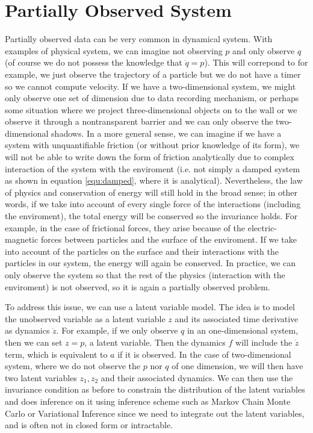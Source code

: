 \documentclass{statsmsc}
\begin{document}
\section{Partially Observed System}
Partially observed data can be very common in dynamical system.
With examples of physical system, we can imagine not observing $p$ and only observe $q$ (of course we do not possess the knowledge that $\dot{q}=p$).
This will correpond to for example, we just observe the trajectory of a particle but we do not have a timer so we cannot compute velocity.
If we have a two-dimensional system, we might only observe one set of dimension due to data recording mechanism, or perhaps some situation where we project three-dimensional objects on to the wall or we observe it through a nontransparent barrier and we can only observe the two-dimensional shadows.
In a more general sense, we can imagine if we have a system with unquantifiable friction (or without prior knowledge of its form), we will not be able to write down the form of friction analytically due to complex interaction of the system with the enviroment (i.e. not simply a damped system as shown in equation \ref{equ:damped}, where it is analytical).
Nevertheless, the law of physics and conservation of energy will still hold in the broad sense; 
in other words, if we take into account of every single force of the interactions (including the enviroment), the total energy will be conserved so the invariance holds. 
For example, in the case of frictional forces, they arise because of the electric-magnetic forces between particles and the surface of the enviroment.
If we take into account of the particles on the surface and their interactions with the particles in our system, the energy will again be conserved. 
In practice, we can only observe the system so that the rest of the physics (interaction with the enviroment) is not observed, so it is again a partially observed problem.

To address this issue, we can use a latent variable model. 
The idea is to model the unobserved variable as a latent variable $z$ and its associated time derivative as dynamics $\dot{z}$.
For example, if we only observe $q$ in an one-dimensional system, then we can set $z=p$, a latent variable. 
Then the dynamics $f$ will include the $\dot{z}$ term, which is equivalent to $a$ if it is observed. 
In the case of two-dimensional system, where we do not observe the $p$ nor $q$ of one dimension, we will then have two latent variables $z_1, z_2$ and their associated dynamics.
We can then use the invariance condition as before to constrain the distribution of the latent variables and does inference on it using inference scheme such as Markov Chain Monte Carlo or Variational Inference since we need to integrate out the latent variables, and is often not in closed form or intractable.
\end{document}
